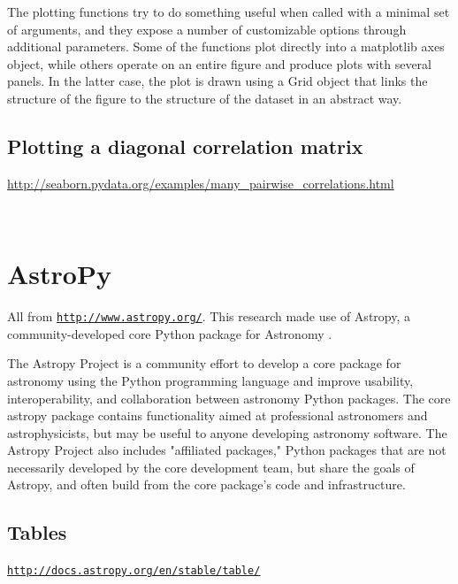 \documentclass[11pt,a4paper]{article}
\begin{document}
The plotting functions try to do something useful when called with a minimal set of arguments, and they expose a number of customizable options through additional parameters. Some of the functions plot directly into a matplotlib axes object, while others operate on an entire figure and produce plots with several panels. In the latter case, the plot is drawn using a Grid object that links the structure of the figure to the structure of the dataset in an abstract way.

    \subsection{Plotting a diagonal correlation matrix}
    \href{http://seaborn.pydata.org/examples/many_pairwise_correlations.html}{http://seaborn.pydata.org/examples/many_pairwise_correlations.html}\\
    
    \begin{lstlisting}
      
    \end{lstlisting}


\newpage
\section{{AstroPy}}
All from \href{http://www.astropy.org/}{\tt http://www.astropy.org/}.
This research made use of Astropy, a community-developed core Python
package for Astronomy \citep{Astropy13}. 

\smallskip
\smallskip
\noindent
The Astropy Project is a community effort to develop a core package
for astronomy using the Python programming language and improve
usability, interoperability, and collaboration between astronomy
Python packages. The core astropy package contains functionality aimed
at professional astronomers and astrophysicists, but may be useful to
anyone developing astronomy software. The Astropy Project also
includes "affiliated packages," Python packages that are not
necessarily developed by the core development team, but share the
goals of Astropy, and often build from the core package's code and
infrastructure.


\subsection{Tables} 
\smallskip
\smallskip
\noindent
\href{http://docs.astropy.org/en/stable/table/}{\tt http://docs.astropy.org/en/stable/table/}
\end{document}
